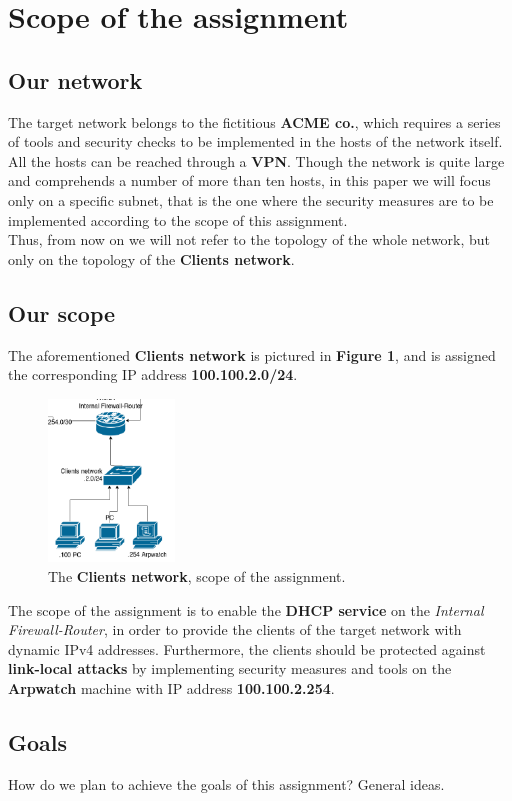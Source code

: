 \section{Scope of the assignment}
\subsection{Our network}
The target network belongs to the fictitious \textbf{ACME co.}, which requires a series of tools and security checks to be implemented in the hosts of the network itself.\\
All the hosts can be reached through a \textbf{VPN}. Though the network is quite large and comprehends a number of more than ten hosts, in this paper we will focus only on a specific subnet, that is the one where the security measures are to be implemented according to the scope of this assignment.\\
Thus, from now on we will not refer to the topology of the whole network, but only on the topology of the \textbf{Clients network}.

\subsection{Our scope}
The aforementioned \textbf{Clients network} is pictured in \textbf{Figure 1}, and is assigned the corresponding IP address \textbf{100.100.2.0/24}.\\

\begin{figure}[htpb]
\centering
\includegraphics[width=0.3\textwidth]{clientsNetwork.png}
\caption[a]{The \textbf{Clients network}, scope of the assignment.}\label{fig:1}
\end{figure}

The scope of the assignment is to enable the \textbf{DHCP service} on the \textit{Internal Firewall-Router}, in order to provide the clients of the target network with dynamic IPv4 addresses. Furthermore, the clients should be protected against \textbf{link-local attacks} by implementing security measures and tools on the \textbf{Arpwatch} machine with IP address \textbf{100.100.2.254}.

\subsection{Goals}
How do we plan to achieve the goals of this assignment?
General ideas.
